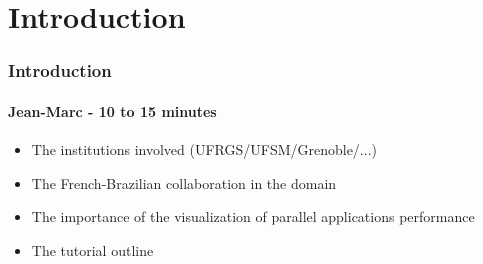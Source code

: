 \section{Introduction}

\frame
{
  \frametitle{Introduction}
  \framesubtitle{Jean-Marc - 10 to 15 minutes}

  \begin{itemize}
  \item The institutions involved (UFRGS/UFSM/Grenoble/...)
  \item The French-Brazilian collaboration in the domain
  \item The importance of the visualization of parallel applications performance
  \item The tutorial outline
  \end{itemize}
}
